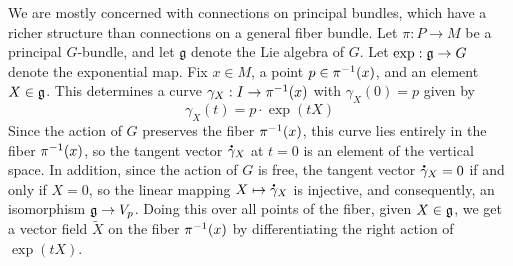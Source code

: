 %
We are mostly concerned with connections on principal bundles, which have a
richer structure than connections on a general fiber bundle. Let $\pi : P \to M$
be a principal $G$-bundle, and let $\mathfrak{g}$ denote the Lie algebra of $G$.
Let $\exp : \mathfrak{g} \to G$ denote the exponential map. Fix $x \in M$, a point
$p \in \pi^{-1}(x)$, and an element $X \in \mathfrak{g}$. This determines a curve
$\gamma_X : I \to \pi^{-1}(x)$ with $\gamma_X(0) = p$ given by
\[
\gamma_X(t) = p \cdot \exp(tX)
\]
Since the action of $G$ preserves the fiber $\pi^{-1}(x)$, this curve lies
entirely in the fiber $\pi^{-1}(x)$, so the tangent vector $\accentset{\mbox{\large\bfseries .}}{\gamma}_X$
at $t = 0$ is an element of the vertical space. In addition, since the
action of $G$ is free, the tangent vector $\accentset{\mbox{\large\bfseries .}}{\gamma}_X = 0$ if and only if
$X = 0$, so the linear mapping $X \mapsto \accentset{\mbox{\large\bfseries .}}{\gamma}_X$ is injective, and
consequently, an isomorphism $\mathfrak{g} \to V_p$. Doing this over all points of the
fiber, given $X \in \mathfrak{g}$, we get a vector field $\tilde{X}$
on the fiber $\pi^{-1}(x)$ by differentiating the right action of $\exp(tX)$.

